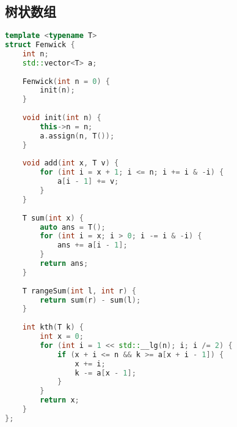 \subsection{树状数组}
\begin{lstlisting}[language=c++]
template <typename T>
struct Fenwick {
    int n;
    std::vector<T> a;
     
    Fenwick(int n = 0) {
        init(n);
    }
     
    void init(int n) {
        this->n = n;
        a.assign(n, T());
    }
     
    void add(int x, T v) {
        for (int i = x + 1; i <= n; i += i & -i) {
            a[i - 1] += v;
        }
    }
     
    T sum(int x) {
        auto ans = T();
        for (int i = x; i > 0; i -= i & -i) {
            ans += a[i - 1];
        }
        return ans;
    }
     
    T rangeSum(int l, int r) {
        return sum(r) - sum(l);
    }
     
    int kth(T k) {
        int x = 0;
        for (int i = 1 << std::__lg(n); i; i /= 2) {
            if (x + i <= n && k >= a[x + i - 1]) {
                x += i;
                k -= a[x - 1];
            }
        }
        return x;
    }
};
\end{lstlisting}